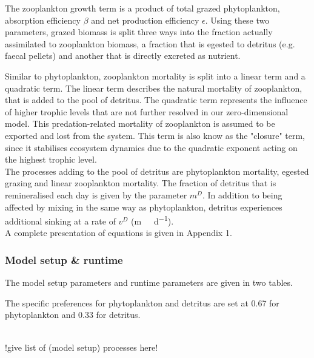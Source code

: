 \documentclass[template.tex]{subfiles}
\begin{document}
The zooplankton growth term is a product of total grazed phytoplankton, absorption efficiency $\beta$ and net production efficiency $\epsilon$. Using these two parameters, grazed biomass is split three ways into the fraction actually assimilated to zooplankton biomass, a fraction that is egested to detritus (e.g. faecal pellets) and another that is directly excreted as nutrient. 

Similar to phytoplankton, zooplankton mortality is split into a linear term and a quadratic term. The linear term describes the natural mortality of zooplankton, that is added to the pool of detritus. The quadratic term represents the influence of higher trophic levels that are not further resolved in our zero-dimensional model. This predation-related mortality of zooplankton is assumed to be exported and lost from the system.
This term is also know as the "closure" term, since it stabilises ecosystem dynamics due to the quadratic exponent acting on the highest trophic level.\\

The processes adding to the pool of detritus are phytoplankton mortality, egested grazing and linear zooplankton mortality. The fraction of detritus that is remineralised each day is given by the parameter $m
^D$. In addition to being affected by mixing in the same way as phytoplankton, detritus experiences additional sinking at a rate of $v^D$ (\unit{m \ d^{-1}}).\\

A complete presentation of equations is given in Appendix 1.\\

\clearpage

\subsubsection{Model setup \& runtime}
The model setup parameters and runtime parameters are given in two tables.

The specific preferences for phytoplankton and detritus are set at 0.67 for phytoplankton and 0.33 for detritus.

\\

!give list of (model setup) processes here!\\
\end{document}
